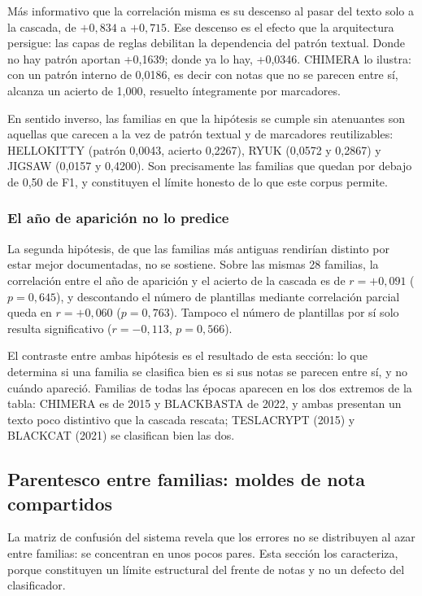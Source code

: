 Más informativo que la correlación misma es su descenso al pasar del texto solo a la cascada, de $+0{,}834$ a $+0{,}715$. Ese descenso es el efecto que la arquitectura persigue: las capas de reglas debilitan la dependencia del patrón textual. Donde no hay patrón aportan +0,1639; donde ya lo hay, +0,0346. CHIMERA lo ilustra: con un patrón interno de 0,0186, es decir con notas que no se parecen entre sí, alcanza un acierto de 1,000, resuelto íntegramente por marcadores.

En sentido inverso, las familias en que la hipótesis se cumple sin atenuantes son aquellas que carecen a la vez de patrón textual y de marcadores reutilizables: HELLOKITTY (patrón 0,0043, acierto 0,2267), RYUK (0,0572 y 0,2867) y JIGSAW (0,0157 y 0,4200). Son precisamente las familias que quedan por debajo de 0,50 de F1, y constituyen el límite honesto de lo que este corpus permite.

\subsubsection*{El año de aparición no lo predice}

La segunda hipótesis, de que las familias más antiguas rendirían distinto por estar mejor documentadas, no se sostiene. Sobre las mismas 28 familias, la correlación entre el año de aparición y el acierto de la cascada es de $r = +0{,}091$ ($p = 0{,}645$), y descontando el número de plantillas mediante correlación parcial queda en $r = +0{,}060$ ($p = 0{,}763$). Tampoco el número de plantillas por sí solo resulta significativo ($r = -0{,}113$, $p = 0{,}566$).

El contraste entre ambas hipótesis es el resultado de esta sección: lo que determina si una familia se clasifica bien es si sus notas se parecen entre sí, y no cuándo apareció. Familias de todas las épocas aparecen en los dos extremos de la tabla: CHIMERA es de 2015 y BLACKBASTA de 2022, y ambas presentan un texto poco distintivo que la cascada rescata; TESLACRYPT (2015) y BLACKCAT (2021) se clasifican bien las dos.


\subsection{Parentesco entre familias: moldes de nota compartidos}
\label{subsec:res_linaje}

La matriz de confusión del sistema revela que los errores no se distribuyen al azar entre familias: se concentran en unos pocos pares. Esta sección los caracteriza, porque constituyen un límite estructural del frente de notas y no un defecto del clasificador.

